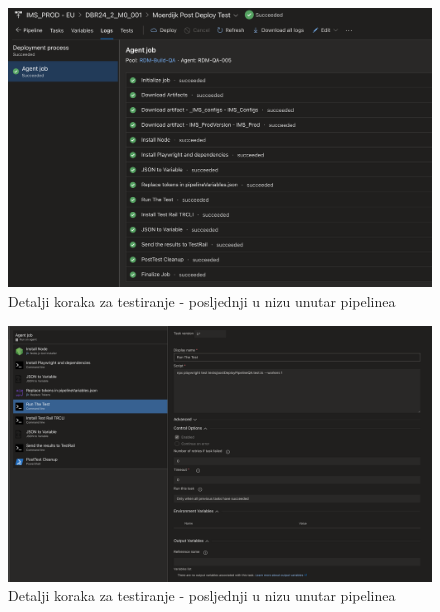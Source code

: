\begin{figure}[!h]\begin{center}
  \includegraphics[width=1\textwidth]{"img/CI_pipeline"}
  \caption{Detalji koraka za testiranje - posljednji u nizu unutar pipelinea}\label{img:CI_pipeline}
\end{center}\end{figure}

\begin{figure}[!h]\begin{center}
  \includegraphics[width=1\textwidth]{"img/CI_testConfig"}
  \caption{Detalji koraka za testiranje - posljednji u nizu unutar pipelinea}\label{img:CI_testConfig}
\end{center}\end{figure}